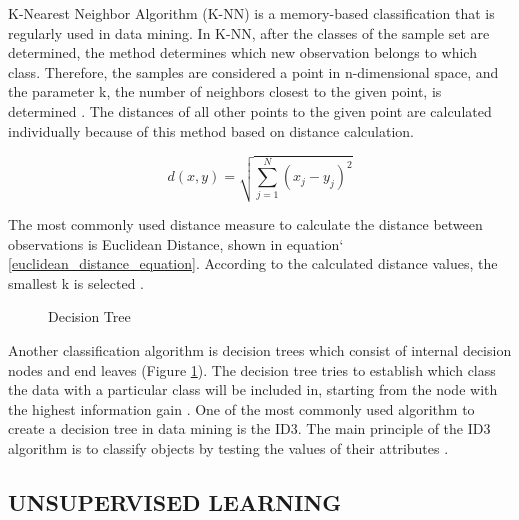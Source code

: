 K-Nearest Neighbor Algorithm (K-NN) is a memory-based classification that is regularly used in data mining. In K-NN, after the classes of the sample set are determined, the method determines which new observation belongs to which class. Therefore, the samples are considered a point in n-dimensional space, and the parameter k, the number of neighbors closest to the given point, is determined \cite{cover1967nearest}. The distances of all other points to the given point are calculated individually because of this method based on distance calculation. 

\begin{equation} \label{euclidean_distance_equation}
d(x,y) = \sqrt{\sum_{j=1}^{N}(x_j - y_j)^2}
\end{equation}

The most commonly used distance measure to calculate the distance between observations is Euclidean Distance, shown in equation` \ref{euclidean_distance_equation}. According to the calculated distance values, the smallest k is selected  \cite{hall2008choice}.

\begin{figure}[htbp]
\centering
{}
\caption{Decision Tree}
\label{fig:DecisionTreeExample}
\end{figure}

Another classification algorithm is decision trees which consist of internal decision nodes and end leaves (Figure \ref{fig:DecisionTreeExample}). The decision tree tries to establish which class the data with a particular class will be included in, starting from the node with the highest information gain \cite{hssina2014comparative}. One of the most commonly used algorithm to create a decision tree in data mining is the ID3. The main principle of the ID3 algorithm is to classify objects by testing the values of their attributes \cite{jin2009improved}.

\subsection{UNSUPERVISED LEARNING}

